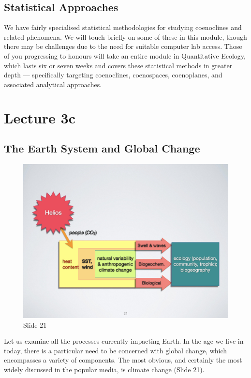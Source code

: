 \documentclass[
  10pt,
]{book}
\begin{document}
\section{Statistical Approaches}\label{statistical-approaches}

We have fairly specialised statistical methodologies for studying
coenoclines and related phenomena. We will touch briefly on some of
these in this module, though there may be challenges due to the need for
suitable computer lab access. Those of you progressing to honours will
take an entire module in Quantitative Ecology, which lasts six or seven
weeks and covers these statistical methods in greater depth ---
specifically targeting coenoclines, coenospaces, coenoplanes, and
associated analytical approaches.

\chapter*{Lecture 3c}\label{lecture-3c}

\section{The Earth System and Global
Change}\label{the-earth-system-and-global-change}

\begin{figure}[ht]
\centering
\includegraphics[width=0.8\linewidth]{../images/BDC334/BDC334-021.jpeg}
\caption*{Slide 21}
\end{figure}

Let us examine all the processes currently impacting Earth. In the age
we live in today, there is a particular need to be concerned with global
change, which encompasses a variety of components. The most obvious, and
certainly the most widely discussed in the popular media, is climate
change (Slide 21).
\end{document}

